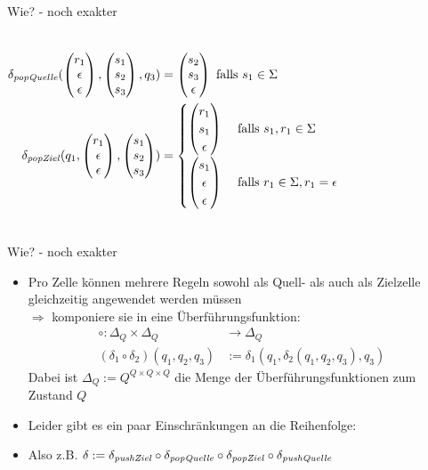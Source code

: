 \documentclass{beamer}
\begin{document}
\begin{frame}[t]{Wie? - noch exakter}
\begin{itemize}
{\begin{columns}
\begin{tikzpicture}[scale=0.4,>=stealth]
                    \end{tikzpicture}
                    \column{0cm}
                    \begin{align*}
                        \delta_{\popQuelle}(\ve{r_1}{\epsilon}{\epsilon},\ve{s_1}{s_2}{s_3},q_3) &= \ve{s_2}{s_3}{\epsilon} \text { falls } s_1 \in \Sigma \\
                        \delta_{\popZiel}(q_1,\ve{r_1}{\epsilon}{\epsilon},\ve{s_1}{s_2}{s_3}) &= \begin{cases}
                            \ve{r_1}{s_1}{\epsilon} &\text { falls } s_1,r_1 \in \Sigma \\
                            \ve{s_1}{\epsilon}{\epsilon} &\text { falls } r_1 \in \Sigma, r_1 = \epsilon
                        \end{cases}
                    \end{align*}
                \end{columns}
            }
    \end{itemize}
\end{frame}

\begin{frame}{Wie? - noch exakter}
    \begin{itemize}
        \item Pro Zelle können mehrere Regeln sowohl als Quell- als auch als Zielzelle gleichzeitig angewendet werden müssen\\
            $\Rightarrow$ komponiere sie in eine Überführungsfunktion:
            \begin{align*}
                \circ : \Delta_Q \times \Delta_Q &\rightarrow \Delta_Q \\
                (\delta_1 \circ \delta_2)(q_1,q_2,q_3) &:= \delta_1(q_1,\delta_2(q_1,q_2,q_3),q_3)
            \end{align*}
            Dabei ist $\Delta_Q := Q^{Q\times Q \times Q}$ die Menge der Überführungsfunktionen zum Zustand $Q$
        \item Leider gibt es ein paar Einschränkungen an die Reihenfolge:
            \begin{center}
            \end{center}
        \item Also z.B.
            $ \delta := \delta_{\pushZiel} \circ \delta_{\popQuelle} \circ \delta_{\popZiel} \circ \delta_{\pushQuelle} $
    \end{itemize}
\end{frame}
\end{document}
